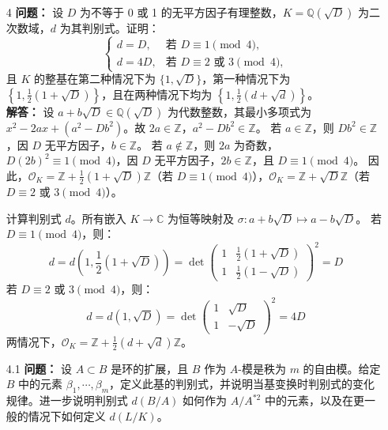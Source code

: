 \documentclass[UTF8]{ctexart}
\begin{document}
\begin{enumerate}
\item[4] 
\textbf{问题：} 设 \(D\) 为不等于 0 或 1 的无平方因子有理整数，\(K = \mathbb{Q}(\sqrt{D})\) 为二次数域，\(d\) 为其判别式。证明：
\[
\begin{cases}
d = D, & \text{若 } D \equiv 1 \pmod{4}, \\
d = 4D, & \text{若 } D \equiv 2 \text{ 或 } 3 \pmod{4},
\end{cases}
\]
且 \(K\) 的整基在第二种情况下为 \(\{1, \sqrt{D}\}\)，第一种情况下为 \(\left\{1, \frac{1}{2}(1 + \sqrt{D})\right\}\)，且在两种情况下均为 \(\left\{1, \frac{1}{2}(d + \sqrt{d})\right\}\)。\\
\textbf{解答：} 设 \(a + b \sqrt{D} \in \mathbb{Q}(\sqrt{D})\) 为代数整数，其最小多项式为 \(x^2 - 2a x + (a^2 - D b^2)\)。故 \(2a \in \mathbb{Z}\)，\(a^2 - D b^2 \in \mathbb{Z}\)。  
若 \(a \in \mathbb{Z}\)，则 \(D b^2 \in \mathbb{Z}\)，因 \(D\) 无平方因子，\(b \in \mathbb{Z}\)。  
若 \(a \notin \mathbb{Z}\)，则 \(2a\) 为奇数，\(D (2b)^2 \equiv 1 \pmod{4}\)，因 \(D\) 无平方因子，\(2b \in \mathbb{Z}\)，且 \(D \equiv 1 \pmod{4}\)。  
因此，\(\mathcal{O}_K = \mathbb{Z} + \frac{1}{2}(1 + \sqrt{D}) \mathbb{Z}\)（若 \(D \equiv 1 \pmod{4}\)），\(\mathcal{O}_K = \mathbb{Z} + \sqrt{D} \mathbb{Z}\)（若 \(D \equiv 2 \text{ 或 } 3 \pmod{4}\)）。  

计算判别式 \(d\)。所有嵌入 \(K \to \mathbb{C}\) 为恒等映射及 \(\sigma: a + b \sqrt{D} \mapsto a - b \sqrt{D}\)。  
若 \(D \equiv 1 \pmod{4}\)，则：
\[
d = d\left(1, \frac{1}{2}(1 + \sqrt{D})\right) = \det\begin{pmatrix} 1 & \frac{1}{2}(1 + \sqrt{D}) \\ 1 & \frac{1}{2}(1 - \sqrt{D}) \end{pmatrix}^2 = D
\]
若 \(D \equiv 2 \text{ 或 } 3 \pmod{4}\)，则：
\[
d = d(1, \sqrt{D}) = \det\begin{pmatrix} 1 & \sqrt{D} \\ 1 & -\sqrt{D} \end{pmatrix}^2 = 4D
\]
两情况下，\(\mathcal{O}_K = \mathbb{Z} + \frac{1}{2}(d + \sqrt{d}) \mathbb{Z}\)。  


\item[4.1] \textbf{问题：} 设 \( A \subset B \) 是环的扩展，且 \( B \) 作为 \( A \)-模是秩为 \( m \) 的自由模。给定 \( B \) 中的元素 \(\beta_1, \cdots, \beta_m\)，定义此基的判别式，并说明当基变换时判别式的变化规律。进一步说明判别式 \( d(B / A) \) 如何作为 \( A / A^{*2} \) 中的元素，以及在更一般的情况下如何定义 \( d(L / K) \)。


\end{enumerate}
\end{document}
